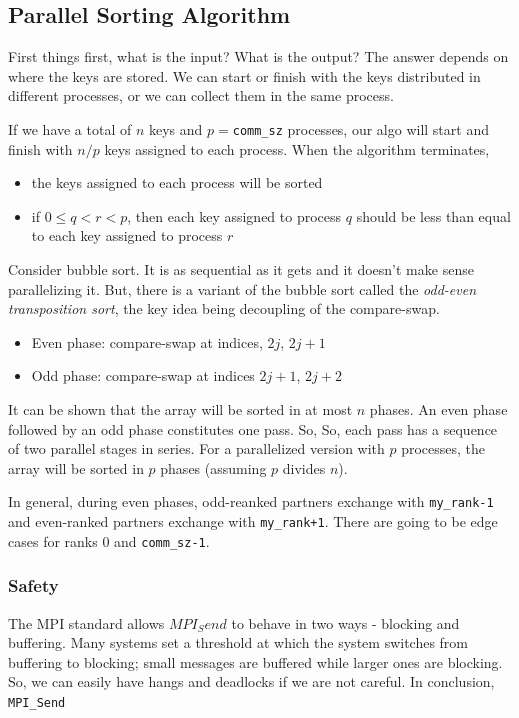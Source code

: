 \documentclass[a4paper]{article}
\begin{document}
\subsection*{Parallel Sorting Algorithm}
First things first, what is the input? What is the output? The answer
depends on where the keys are stored. We can start or finish with
the keys distributed in different processes, or we can collect them
in the same process.

If we have a total of $n$ keys and $p = $\texttt{comm\_sz} processes,
our algo will start and finish with $n/p$ keys assigned to each process.
When the algorithm terminates, 
\begin{itemize}
	\item  the keys assigned to each process
		will be sorted
	\item if $0\le q < r < p$, then each key assigned to process
		$q$ should be less than equal to each key assigned
		to process $r$
\end{itemize}

Consider bubble sort. It is as sequential as it gets and it doesn't
make sense parallelizing it. But, there is a variant of the bubble
sort called the \emph{odd-even transposition sort}, the key idea
being decoupling of the compare-swap.
\begin{itemize}
	\item Even phase: compare-swap at indices, $2j$, $2j+1$ 
	\item Odd phase: compare-swap at indices $2j+1$, $2j+2$
\end{itemize}
It can be shown that the array will be sorted in at most $n$ phases.
An even phase followed by an odd phase constitutes one pass. So,
So, each pass has a sequence of two parallel stages in series.
For a parallelized version with $p$ processes, the array will be 
sorted in $p$ phases (assuming $p$  divides $n$).

In general, during even phases, odd-reanked partners exchange with
 \texttt{my\_rank-1} and even-ranked partners exchange with
 \texttt{my\_rank+1}. There are going to be edge cases for 
 ranks 0 and  \texttt{comm\_sz-1}.

\subsubsection*{Safety}
The MPI standard allows $MPI_Send$ to behave in two ways - blocking
and buffering. Many systems set a threshold at which the system
switches from buffering to blocking; small messages are buffered
while larger ones are blocking. So, we can easily have hangs
and deadlocks if we are not careful. In conclusion, \texttt{MPI\_Send} 
\end{document}
